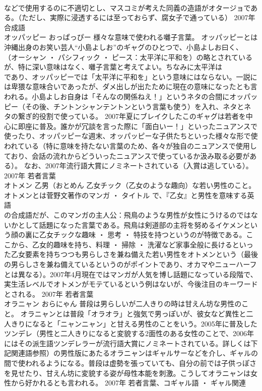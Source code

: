 \documentclass[8pt]{extreport}
\begin{document}
\begin{CJK}{UTF8}{min}
\\	などで使用するのに不適切とし、マスコミが考えた同義の造語がオタージョである。（ただし、実際に浸透するには至っておらず、腐女子で通っている）	2007年	合成語	
\\	オッパッピー	おっぱっぴー	様々な意味で使われる囃子言葉。	オッパッピーとは沖縄出身のお笑い芸人“小島よしお”のギャグのひとつで、小島よしお曰く、
\\	（オーシャン ・ パシフィック ・ ピース：太平洋に平和を）の略とされているが、特に深い意味はなく、囃子言葉と考えてよい。ちなみに太平洋は
\\	であり、オッパッピーでは「太平洋に平和を」という意味にはならない。一説には卑猥な意味合いであったが、ダメ出しが出たために現在の意味になったとも言われる。小島よしお自身は「そんなの関係ねえ！」というネタの合間にオッパッピー（その後、チントンシャンテントンという言葉も使う）を入れ、ネタとネタの繋ぎ的役割で使っている。 2007年夏にブレイクしたこのギャグは若者を中心に即座に普及。誰かが冗談を言った際に「面白いー！」といったニュアンスで使ったり、オッパッピーな週末、オッパッピーな子供たちといった様々な形で使われている（特に意味を持たない言葉のため、各々が独自のニュアンスで使用しており、会話の流れからどういったニュアンスで使っているか汲み取る必要がある）。 なお、2007年流行語大賞にノミネートされている（入賞は逃している）。	2007年	若者言葉	
\\	オトメン	乙男（おとめん	乙女チック（乙女のような趣向）な若い男性のこと。	オトメンとは菅野文著作のマンガ ・ タイトル で、『乙女』と男性を意味する英語
\\	の合成語だが、このマンガの主人公：飛鳥のような男性が女性にうけるのではないかとして話題になった言葉である。飛鳥は剣道部の主将を努めるイケメンという顔の裏に乙女チックな趣味 ・ 思考 ・ 特技を持つというのが特徴である。ここから、乙女的趣味を持ち、料理 ・ 掃除 ・ 洗濯など家事全般に長けるといった乙女要素を持ちつつも男らしさを兼ね備えた若い男性をオトメンという（最後の男らしさを兼ね備えているというのがポイントであり、オカマやニューハーフとは異なる）。2007年4月現在ではマンガが人気を博し話題になっている段階で、実生活レベルでオトメンがモテているという例はないが、今後注目のキーワードとされる。	2007年	若者言葉	
\\	オラニャン	おらにゃん	普段は男らしいが二人きりの時は甘えん坊な男性のこと。	オラニャンとは普段「オラオラ」と強気で男っぽいが、彼女など異性と二人きりになると「ニャンニャン」と甘える男性のことをいう。2005年に普及したツンデレ（男性と二人きりになると変貌する2面性のある女性のことで、2006年にはその派生語ツンデレラーが流行語大賞にノミネートされている。詳しくは下記関連語参照）の男性版にあたるオラニャンはギャルサーなどを介し、ギャルの間で使われるようになる。普段は虚勢を張っていても、自分の前では子供っぽさを見せたり、甘えん坊に変貌する姿が母性本能を刺激。こうしてオラニャンは女性から好かれるとも言われる。	2007年	若者言葉、コギャル語 ・ ギャル関連	

\end{CJK}
\end{document}
